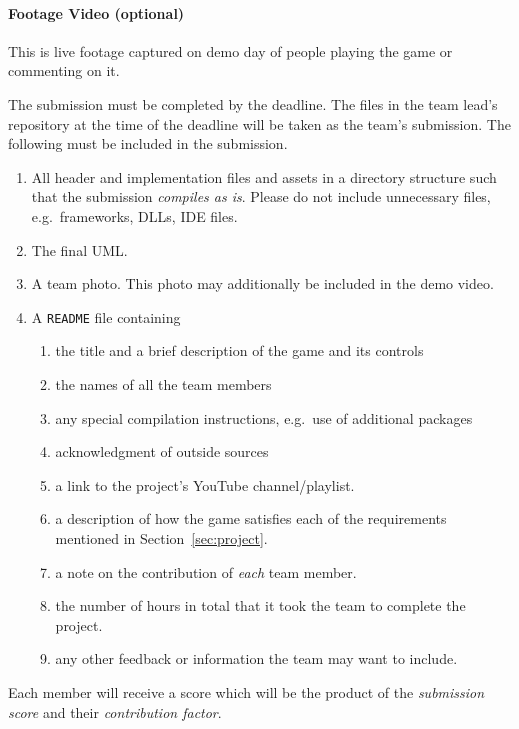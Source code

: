\documentclass[addpoints]{exam}
\begin{document}
\begin{questions}
\paragraph{Footage Video (optional)} This is live footage captured on demo day of people playing the game or commenting on it.


  The submission must be completed by the deadline. The files in the team lead's repository at the time of the deadline will be taken as the team's submission. The following must be included in the submission.
  \begin{enumerate}
  \item All header and implementation files and assets in a directory structure such that the submission \textit{compiles as is}. Please do not include unnecessary files, e.g.\ frameworks, DLLs, IDE files.
  \item The final UML.
  \item A team photo. This photo may additionally be included in the demo video.
  \item A \texttt{README} file containing
    \begin{enumerate}
    \item the title and a brief description of the game and its controls
    \item the names of all the team members
    \item any special compilation instructions, e.g.\ use of additional packages
    \item acknowledgment of outside sources
    \item a link to the project's YouTube channel/playlist.
    \item a description of how the game satisfies each of the requirements mentioned in Section~\ref{sec:project}.
    \item a note on the contribution of \textit{each} team member.
    \item the number of hours in total that it took the team to complete the project.
    \item any other feedback or information the team may want to include.
    \end{enumerate}
  \end{enumerate}
  
  Each member will receive a score which will be the product of the \textit{submission score} and their \textit{contribution factor}.

\end{questions}
\end{document}
